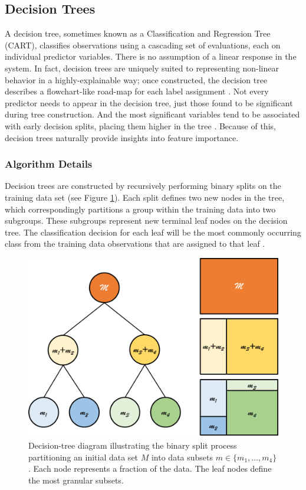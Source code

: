 \subsection{Decision Trees}\label{ch3:decision_trees}

A decision tree, sometimes known as a Classification and Regression Tree (CART), classifies observations using a cascading set of evaluations, each on individual predictor variables. There is no assumption of a linear response in the system. In fact, decision trees are uniquely suited to representing non-linear behavior in a highly-explainable way; once constructed, the decision tree describes a flowchart-like road-map for each label assignment \citep[p.\ 373--375]{bertsimas_analytics_2016}. Not every predictor needs to appear in the decision tree, just those found to be significant during tree construction. And the most significant variables tend to be associated with early decision splits, placing them higher in the tree \citep[p.\ 376]{bertsimas_analytics_2016}. Because of this, decision trees naturally provide insights into feature importance. 

\subsubsection{Algorithm Details}\label{ch3:dtree_details}

Decision trees are constructed by recursively performing binary splits on the training data set (see Figure \ref{fig:dtree_schematic}). Each split defines two new nodes in the tree, which correspondingly partitions a group within the training data into two subgroups. These subgroups represent new terminal leaf nodes on the decision tree. The classification decision for each leaf will be the most commonly occurring class from the training data observations that are assigned to that leaf \citep[p.\ 311]{james_introduction_2013}.

\begin{figure}
    \centering
    \includegraphics[width=.65\linewidth]{templates/images/Figure-DecisionTree_Schematic.png}
    \caption[Decision tree schematic]{Decision-tree diagram illustrating the binary split process partitioning an initial data set $M$ into data subsets $m\in\{m_1,\ldots,m_4\}$. Each node represents a fraction of the data. The leaf nodes define the most granular subsets.}
    \label{fig:dtree_schematic}
\end{figure}

